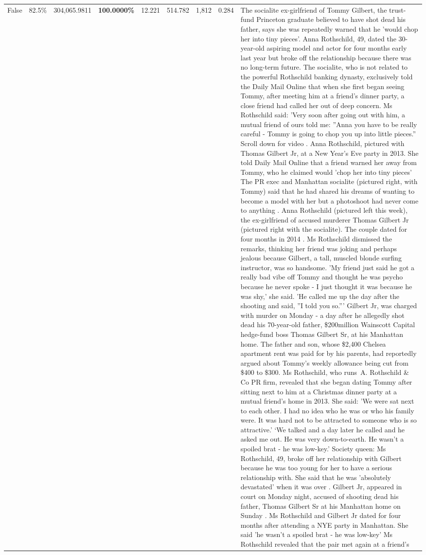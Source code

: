 \begin{table}[H]
\begin{tabular}{lllrlllll}
False & 82.5\% & \color{red} 304,065.9811 & \bfseries \color{red} 100.0000\% & 12.221 & 514.782 & 1,812 & 0.284 & The socialite ex-girlfriend of Tommy Gilbert, the trust-fund Princeton graduate believed to have shot dead his father, says she was repeatedly warned that he 'would chop her into tiny pieces'. Anna Rothschild, 49, dated the 30-year-old aspiring model and actor for four months early last year but broke off the relationship because there was no long-term future. The socialite, who is not related to the powerful Rothschild banking dynasty, exclusively told the Daily Mail Online that when she first began seeing Tommy, after meeting him at a friend's dinner party, a close friend had called her out of deep concern. Ms Rothschild said: 'Very soon after going out with him, a mutual friend of ours told me: ''Anna you have to be really careful - Tommy is going to chop you up into little pieces.'' Scroll down for video . Anna Rothschild, pictured with Thomas Gilbert Jr, at a New Year's Eve party in 2013. She told Daily Mail Online that a friend warned her away from Tommy, who he claimed would 'chop her into tiny pieces' The PR exec and Manhattan socialite (pictured right, with Tommy) said that he had shared his dreams of wanting to become a model with her but a photoshoot had never come to anything . Anna Rothschild (pictured left this week), the ex-girlfriend of accused murderer Thomas Gilbert Jr (pictured right with the socialite). The couple dated for four months in 2014 . Ms Rothschild dismissed the remarks, thinking her friend was joking and perhaps jealous because Gilbert, a tall, muscled blonde surfing instructor, was so handsome. 'My friend just said he got a really bad vibe off Tommy and thought he was psycho because he never spoke - I just thought it was because he was shy,' she said. 'He called me up the day after the shooting and said, ''I told you so.''' Gilbert Jr, was charged with murder on Monday - a day after he allegedly shot dead his 70-year-old father, \$200million Wainscott Capital hedge-fund boss Thomas Gilbert Sr, at his Manhattan home. The father and son, whose \$2,400 Chelsea apartment rent was paid for by his parents, had reportedly argued about Tommy's weekly allowance being cut from \$400 to \$300. Ms Rothschild, who runs A. Rothschild \& Co PR firm, revealed that she began dating Tommy after sitting next to him at a Christmas dinner party at a mutual friend's home in 2013. She said: 'We were sat next to each other. I had no idea who he was or who his family were. It was hard not to be attracted to someone who is so attractive.' ‘We talked and a day later he called and he asked me out. He was very down-to-earth. He wasn’t a spoiled brat - he was low-key.’ Society queen: Ms Rothschild, 49, broke off her relationship with Gilbert because he was too young for her to have a serious relationship with. She said that he was 'absolutely devastated' when it was over . Gilbert Jr, appeared in court on Monday night, accused of shooting dead his father, Thomas Gilbert Sr at his Manhattan home on Sunday . Ms Rothschild and Gilbert Jr dated for four months after attending a NYE party in Manhattan. She said 'he wasn't a spoiled brat - he was low-key' Ms Rothschild revealed that the pair met again at a friend’s 
\end{tabular}
\end{table}
